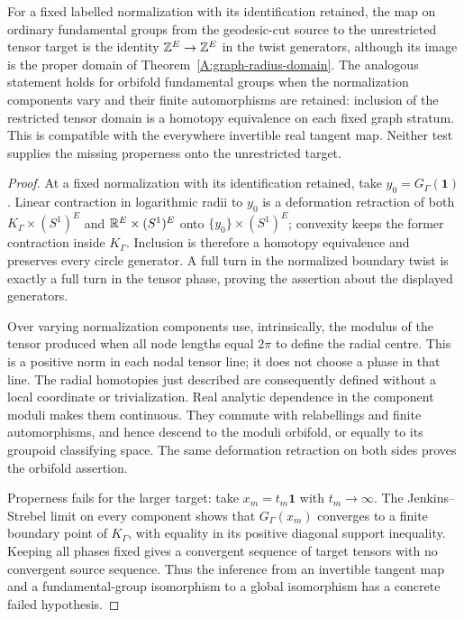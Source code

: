 \begin{corollary}
\label{A:graph-pi-one}
For a fixed labelled normalization with its identification retained,
the map on ordinary fundamental groups
from the geodesic-cut source to the unrestricted tensor target is
the identity ${\mathbb{Z}}^E\to{\mathbb{Z}}^E$ in the twist generators, although its
image is the proper domain of Theorem~\ref{A:graph-radius-domain}.
The analogous statement holds for orbifold fundamental groups when
the normalization components vary and their finite automorphisms
are retained: inclusion of the restricted tensor domain is a
homotopy equivalence on each fixed graph stratum. This is compatible
with the everywhere invertible real tangent map. Neither test supplies
the missing properness onto the unrestricted target.
\end{corollary}

\begin{proof}
At a fixed normalization with its identification retained, take
$y_0=G_\Gamma(\mathbf 1)$. Linear
contraction in logarithmic radii to $y_0$ is a deformation retraction
of both $K_\Gamma\times(S^1)^E$ and
${\mathbb{R}}^E\times(S^1)^E$ onto $\{y_0\}\times(S^1)^E$; convexity keeps
the former contraction inside $K_\Gamma$. Inclusion is therefore a
homotopy equivalence and preserves every circle generator. A full
turn in the normalized boundary twist is exactly a full turn in the
tensor phase, proving the assertion about the displayed generators.

Over varying normalization components use, intrinsically, the modulus
of the tensor produced when all node lengths equal $2\pi$ to define
the radial centre. This is a positive norm in each nodal tensor line;
it does not choose a phase in that line. The radial homotopies just
described are consequently defined without a local coordinate or
trivialization. Real analytic dependence in the component moduli
makes them continuous. They commute with relabellings and finite
automorphisms, and hence descend to the moduli orbifold, or equally
to its groupoid classifying space. The same deformation retraction
on both sides proves the orbifold assertion.

Properness fails for the larger target: take $x_m=t_m\mathbf1$ with
$t_m\to\infty$. The Jenkins--Strebel limit on every component shows
that $G_\Gamma(x_m)$ converges to a finite boundary point of
$K_\Gamma$, with equality in its positive diagonal support
inequality. Keeping all phases fixed gives a convergent sequence
of target tensors with no convergent source sequence. Thus the
inference from an invertible tangent map and a fundamental-group
isomorphism to a global isomorphism has a concrete failed hypothesis.
\end{proof}

